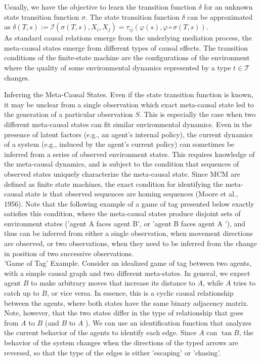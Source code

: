 \documentclass[10pt]{article}
\begin{document}
Usually, we have the objective to learn the transition function $\delta$ for an unknown state transition function $\sigma$. The state transition function $\delta$ can be approximated as $\delta(T, s):=\mathcal{I}\left(\sigma(T, s), X_{i}, X_{j}\right)= \tau_{i j}(\varphi(s), \varphi \circ \sigma(T, s))$.\\
As standard causal relations emerge from the underlying mediation process, the meta-causal states emerge from different types of causal effects. The transition conditions of the finite-state machine are the configurations of the environment where the quality of some environmental dynamics represented by a type $t \in \mathcal{T}$ changes.

Inferring the Meta-Causal States. Even if the state transition function is known, it may be unclear from a single observation which exact meta-causal state led to the generation of a particular observation $S$. This is especially the case when two different meta-causal states can fit similar environmental dynamics. Even in the presence of latent factors (e.g., an agent's internal policy), the current dynamics of a system (e.g., induced by the agent's current policy) can sometimes be inferred from a series of observed environment states. This requires knowledge of the meta-causal dynamics, and is subject to the condition that sequences of observed states uniquely characterize the meta-causal state. Since MCM are defined as finite state machines, the exact condition for identifying the meta-causal state is that observed sequences are homing sequences (Moore et al., 1956). Note that the following example of a game of tag presented below exactly satisfies this condition, where the meta-causal states produce disjoint sets of environment states ('agent A faces agent B', or 'agent B faces agent A '), and thus can be inferred from either a single observation, when movement directions are observed, or two observations, when they need to be inferred from the change in position of two successive observations.\\
'Game of Tag' Example. Consider an idealized game of tag between two agents, with a simple causal graph and two different meta-states. In general, we expect agent $B$ to make arbitrary moves that increase its distance to $A$, while $A$ tries to catch up to $B$, or vice versa. In essence, this is a cyclic causal relationship between the agents, where both states have the same binary adjacency matrix. Note, however, that the two states differ in the type of relationship that goes from $A$ to $B$ (and $B$ to $A$ ). We can use an identification function that analyzes the current behavior of the agents to identify each edge. Since $A$ can $\tan B$, the behavior of the system changes when the directions of the typed arrows are reversed, so that the type of the edges is either 'escaping' or 'chasing'.
\end{document}
